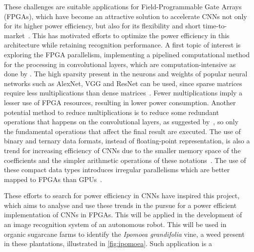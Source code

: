 \documentclass[
    12pt,                       %
    oneside,                    %
    a4paper,                    %
    brazil,                     %
    french,                     %
    spanish,                    %
    english,                    %
    ]{abntex2}
\begin{document}
These challenges are suitable applications for Field-Programmable Gate Arrays (FPGAs), which have become an attractive solution to accelerate CNNs not only for its higher power efficiency, but also for its flexibility and short time-to-market~\cite{Zhang2017}. This has motivated efforts to optimize the power efficiency in this architecture while retaining recognition performance. A first topic of interest is exploring the FPGA parallelism, implementing a pipelined computational method for the processing in convolutional layers, which are computation-intensive as done by \textcite{Sun2017}. The high sparsity present in the neurons and weights of popular neural networks such as AlexNet, VGG and ResNet can be used, since sparse matrices require less multiplications than dense matrices~\cite{Nurvitadhi2017_1}. Fewer multiplications imply a lesser use of FPGA resources, resulting in lower power consumption. Another potential method to reduce multiplications is to reduce some redundant operations that happens on the convolutional layers, as suggested  by~\textcite{Ujiie2016}, so only the fundamental operations that affect the final result are executed. The use of binary and ternary data formats, instead of floating-point representation, is also a trend for increasing efficiency of CNNs due to the smaller memory space of the coefficients and the simpler arithmetic operations of these notations~\cite{Courbariaux2016c, NIPS2016_6573, Venkatesh2017}. The use of these compact data types introduces irregular parallelisms which are better mapped to FPGAs than GPUs~\cite{Nurvitadhi2017_1}.


These efforts to search for power efficiency in CNNs have inspired this project, which aims to analyse and use these trends in the pursue for a power efficient implementation of CNNs in FPGAs. This will be applied in the development of an image recognition system of an autonomous robot. This will be used in organic sugarcane farms to identify the \textit{Ipomoea grandifolia} vine, a weed present in these plantations, illustrated in \autoref{fig:ipomoea}. Such application is a

\end{document}
